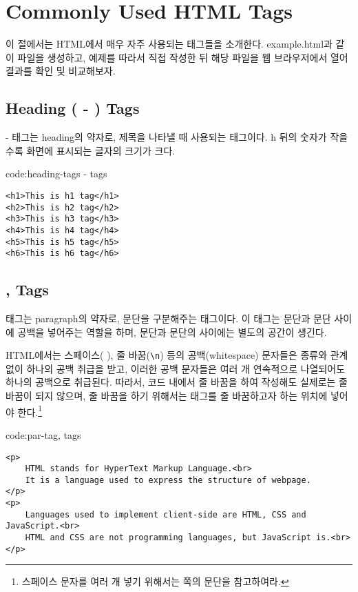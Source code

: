 \section{Commonly Used HTML Tags}\label{sect:common-html-tags}

이 절에서는 HTML에서 매우 자주 사용되는 태그들을 소개한다. example.html과 같이 파일을 생성하고, 예제를 따라서 직접 작성한 뒤 해당 파일을 웹 브라우저에서 열어 결과를 확인 및 비교해보자.

\subsection*{Heading ( - ) Tags}
 -  태그는 heading의 약자로, 제목을 나타낼 때 사용되는 태그이다. h 뒤의 숫자가 작을수록 화면에 표시되는 글자의 크기가 크다.

\begin{codeenv}{code:heading-tags}{ -  tags}\begin{verbatim}
<h1>This is h1 tag</h1>
<h2>This is h2 tag</h2>
<h3>This is h3 tag</h3>
<h4>This is h4 tag</h4>
<h5>This is h5 tag</h5>
<h6>This is h6 tag</h6>
\end{verbatim}
\end{codeenv}

\subsection*{,  Tags}
 태그는 paragraph의 약자로, 문단을 구분해주는 태그이다. 이 태그는 문단과 문단 사이에 공백을 넣어주는 역할을 하며, 문단과 문단의 사이에는 별도의 공간이 생긴다.

HTML에서는 스페이스( ), 줄 바꿈(\verb|\n|) 등의 공백(whitespace) 문자들은 종류와 관계없이 하나의 공백 취급을 받고, 이러한 공백 문자들은 여러 개 연속적으로 나열되어도 하나의 공백으로 취급된다. 따라서, 코드 내에서 줄 바꿈을 하여 작성해도 실제로는 줄 바꿈이 되지 않으며, 줄 바꿈을 하기 위해서는  태그를 줄 바꿈하고자 하는 위치에 넣어야 한다.\footnote{스페이스 문자를 여러 개 넣기 위해서는 \pageref{etc:nbsp}쪽의  문단을 참고하여라.}

\begin{codeenv}{code:par-tag}{,  tags}\begin{verbatim}
<p>
    HTML stands for HyperText Markup Language.<br>
    It is a language used to express the structure of webpage.
</p>
<p>
    Languages used to implement client-side are HTML, CSS and JavaScript.<br>
    HTML and CSS are not programming languages, but JavaScript is.<br>
</p>
\end{verbatim}
\end{codeenv}

